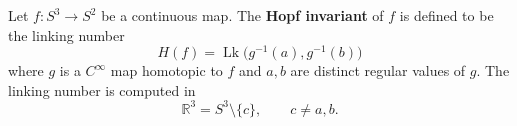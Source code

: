 Let $f \colon S^{3} \to S^{2}$ be a continuous map. The \textbf{Hopf invariant} of $f$ is defined to be the linking number
$$
H(f) = \operatorname{Lk}\bigl(g^{-1}(a), g^{-1}(b)\bigr)
$$
where $g$ is a $C^{\infty}$ map homotopic to $f$ and $a, b$ are distinct regular values of $g$. The linking number is computed in
$$
\mathbb{R}^{3} = S^{3} \setminus \{c\}, \qquad c \neq a, b.
$$
